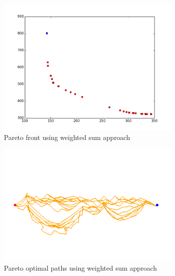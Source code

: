 \documentclass[conference]{IEEEtran}
\begin{document}
\begin{figure}
\begin{subfigure}[b]{0.45\linewidth}
		\includegraphics[width=\textwidth]{fig/sim8-nconvex/PF03-MORRT.png}
		\caption{Pareto front using weighted sum approach}
		\label{fig:sim:nonconvex:pf:a}
	\end{subfigure}
	\begin{subfigure}[b]{0.45\linewidth}
		\centering
		\includegraphics[width=\textwidth]{fig/sim8-nconvex/MORRTstar03-ALL.png}
		\caption{Pareto optimal paths using weighted sum approach}
		\label{fig:sim:nonconvex:sols:a}
	\end{subfigure}  \\
	\begin{subfigure}[b]{0.45\linewidth}
		\centering

\end{subfigure}
\end{figure}
\end{document}
